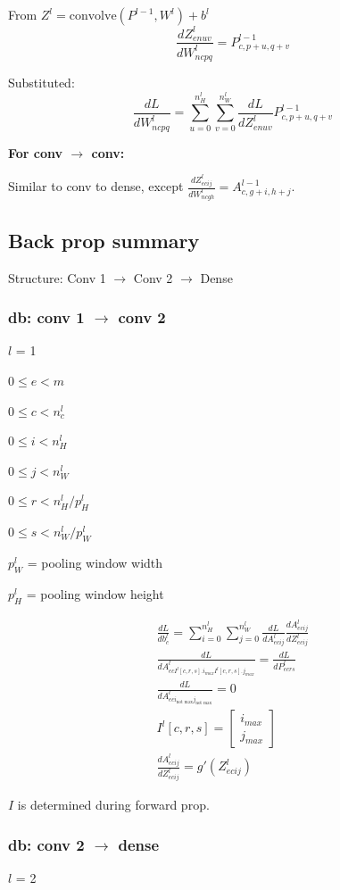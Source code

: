\documentclass[12pt]{article}
\begin{document}
From $Z^l = \text{convolve}(P^{l-1},W^l) + b^l$
\[ \frac{dZ^l_{enuv}}{dW^l_{ncpq}} = P^{l-1}_{c,p+u,q+v} \]

Substituted:
\[ \frac{dL}{dW^l_{ncpq}} = \sum_{u=0}^{n_H^l} \sum_{v=0}^{n_W^l} \frac{dL}{dZ^l_{enuv}}
P^{l-1}_{c,p+u,q+v} \]

\textbf{For conv $\rightarrow$ conv:}

Similar to conv to dense, except $\frac{dZ^l_{ecij}}{dW^l_{ncgh}} = A^{l-1}_{c,g+i,h+j}$.

\subsection{Back prop summary}

Structure: Conv 1 $\rightarrow$ Conv 2 $\rightarrow$ Dense

\subsubsection{db: conv 1 $\rightarrow$ conv 2}
$l$ = 1

$0 \le e < m$

$0 \le c < n^l_c$

$0 \le i < n_H^l$

$0 \le j < n^l_W$

$0 \le r < n_H^l/p_H^l$

$0 \le s < n_W^l/p_W^l$

$p_W^l$ = pooling window width

$p_H^l$ = pooling window height

\begin{gather*}
    \frac{dL}{db^l_c} = \sum_{i=0}^{n^l_H} \sum_{j=0}^{n_W^l} \frac{dL}{dA^l_{ecij}}
    \frac{dA^l_{ecij}}{dZ^l_{ecij}}\\
    \frac{dL}{dA^l_{ec I^l[c,r,s].i_{max} I^l[c,r,s].j_{max}}} = \frac{dL}{dP^l_{ecrs}}\\
    \frac{dL}{dA^l_{ec i_{\text{not max}} j_{\text{not max}}}} = 0\\
    I^l[c,r,s] = \begin{bmatrix}i_{max}\\j_{max}\end{bmatrix}\\
    \frac{dA^l_{ecij}}{dZ^l_{ecij}} = g'(Z^l_{ecij})
\end{gather*}

$I$ is determined during forward prop.

\subsubsection{db: conv 2 $\rightarrow$ dense}
$l$ = 2
\end{document}
